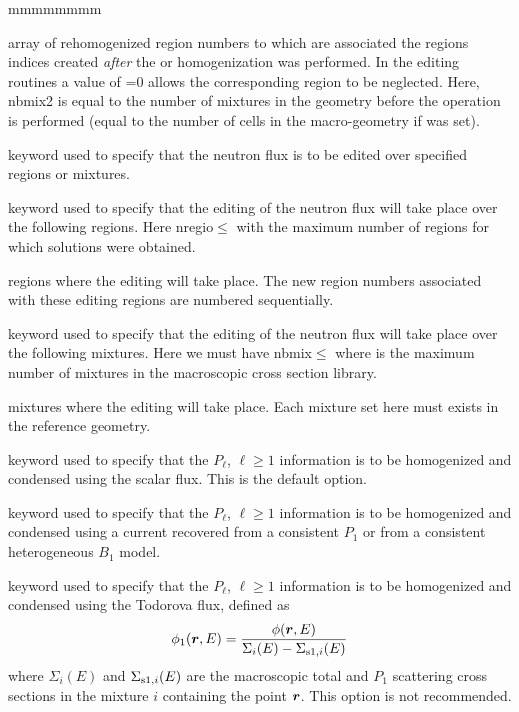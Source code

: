 \begin{ListeDeDescription}{mmmmmmmm}
\item[\dusa{imix2}] array of rehomogenized region numbers to which are associated the regions indices created {\sl after}
the   or   homogenization was performed. In the editing routines a value of =0 allows the corresponding
region to be neglected. Here, nbmix2 is equal to the number of mixtures in the geometry before the  operation is performed (equal to the number
of cells in the macro-geometry if   was set).

\item[\moc{TAKE}] keyword used to specify that the neutron flux is to be edited
over specified regions or mixtures. 

\item[\moc{REGI}] keyword used to specify that the editing of the neutron flux will
take place over the following regions. Here nregio$\le$
with  the maximum number of regions for which solutions were
obtained.

\item[\dusa{iregt}] regions where the editing will take place. The new region
numbers associated with these editing regions are numbered sequentially.

\item[\moc{MIX}] keyword used to specify that the editing of the neutron
flux will take place over the following mixtures. Here
we must have nbmix$\le$ where  is the maximum number
of mixtures in the macroscopic cross section library.  

\item[\dusa{imixt}] mixtures where the editing will take place.
Each mixture set here must exists in the reference geometry.

\item[\moc{P0W}] keyword used to specify that the $P_\ell$, $\ell\ge 1$ information is to be
homogenized and condensed using the scalar flux. This is the default option.

\item[\moc{P1W\_L}] keyword used to specify that the $P_\ell$, $\ell\ge 1$ information is to be
homogenized and condensed using a current recovered from a consistent $P_1$ or
from a consistent heterogeneous $B_1$ model.

\item[\moc{P1W\_TO}] keyword used to specify that the $P_\ell$, $\ell\ge 1$ information is to be
homogenized and condensed using the Todorova flux\cite{todorova}, defined as
$$
\phi_1(\bff(r),E)={\phi(\bff(r),E)\over \Sigma_i(E)-\Sigma_{{\rm s1},i}(E)}
$$
\noindent where $\Sigma_i(E)$ and $\Sigma_{{\rm s1},i}(E)$ are the macroscopic total and $P_1$ scattering
cross sections in the mixture $i$ containing the point $\bff(r)$. This option is not recommended.


\end{ListeDeDescription}
